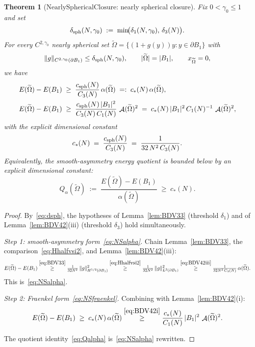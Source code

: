 \documentclass[11pt]{article}
\newtheorem{theorem}{Theorem}[section]
\theoremstyle{definition}
\DeclareMathOperator{\Asym}{\mathcal{A}}
\newcommand{\bdy}{\partial}
\newcommand{\Ot}{\widetilde{\Omega}}
\newcommand{\NS}{\mathrm{NearlySphericalClosure}}
\begin{document}
\begin{theorem}[$\NS$: nearly spherical closure]\label{thm:NS}
Fix $0<\gamma_0\le 1$ and set
\begin{equation}\label{eq:dsph}
\delta_{\rm sph}(N,\gamma_0)
\;:=\;\min\!\bigl(\delta_1(N,\gamma_0),\,\delta_3(N)\bigr).
\end{equation}
For every $C^{2,\gamma_0}$ nearly spherical set
$\Ot=\{(1+g(y))y:y\in\bdy B_1\}$ with
\begin{equation}\label{eq:normal}
\|g\|_{C^{2,\gamma_0}(\bdy B_1)}\le\delta_{\rm sph}(N,\gamma_0),
\qquad |\Ot|=|B_1|,\qquad x_{\Ot}=0,
\end{equation}
we have
\begin{align}
E(\Ot)-E(B_1)
&\;\ge\;
\frac{c_{\rm sph}(N)}{C_3(N)}\,\alpha(\Ot)
\;=:\;c_*(N)\,\alpha(\Ot),
\label{eq:NSalpha}\\
E(\Ot)-E(B_1)
&\;\ge\;
\frac{c_{\rm sph}(N)\,|B_1|^{2}}{C_3(N)\,C_1(N)}\,\Asym(\Ot)^{2}
\;=\;c_*(N)\,|B_1|^{2}\,C_1(N)^{-1}\,\Asym(\Ot)^{2},
\label{eq:NSfraenkel}
\end{align}
with the explicit dimensional constant
\begin{equation}\label{eq:cstar}
c_*(N)\;=\;\frac{c_{\rm sph}(N)}{C_3(N)}
\;=\;\frac{1}{32\,N^2\,C_3(N)}.
\end{equation}
Equivalently, the smooth-asymmetry energy quotient is bounded below by an
explicit dimensional constant:
\begin{equation}\label{eq:Qalpha}
Q_\alpha(\Ot)\;:=\;\frac{E(\Ot)-E(B_1)}{\alpha(\Ot)}
\;\ge\;c_*(N).
\end{equation}
\end{theorem}

\begin{proof}
By~\eqref{eq:dsph}, the hypotheses of Lemma~\ref{lem:BDV33}
(threshold $\delta_1$) and of Lemma~\ref{lem:BDV42}(iii)
(threshold $\delta_3$) hold simultaneously.

\medskip\noindent\emph{Step 1: smooth-asymmetry form~\eqref{eq:NSalpha}.}\;
Chain Lemma~\ref{lem:BDV33}, the comparison~\eqref{eq:Hhalfvsi2}, and
Lemma~\ref{lem:BDV42}(iii):
\[
E(\Ot)-E(B_1)
\stackrel{\eqref{eq:BDV33}}{\ge}
\tfrac{1}{32N^2}\,\|g\|_{H^{1/2}(\bdy B_1)}^2
\stackrel{\eqref{eq:Hhalfvsi2}}{\ge}
\tfrac{1}{32N^2}\,\|g\|_{L^2(\bdy B_1)}^2
\stackrel{\eqref{eq:BDV42iii}}{\ge}
\tfrac{1}{32N^2\,C_3(N)}\,\alpha(\Ot).
\]
This is~\eqref{eq:NSalpha}.

\medskip\noindent\emph{Step 2: Fraenkel form~\eqref{eq:NSfraenkel}.}\;
Combining with Lemma~\ref{lem:BDV42}(i):
\[
E(\Ot)-E(B_1)
\;\ge\;c_*(N)\,\alpha(\Ot)
\stackrel{\eqref{eq:BDV42i}}{\ge}
\frac{c_*(N)}{C_1(N)}\,|B_1|^{2}\,\Asym(\Ot)^{2}.
\]

The quotient identity~\eqref{eq:Qalpha} is~\eqref{eq:NSalpha} rewritten.
\end{proof}
\end{document}

